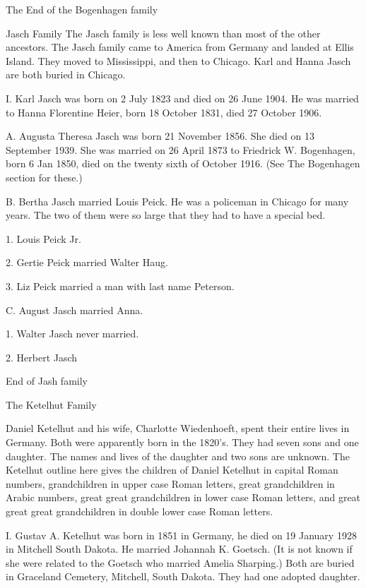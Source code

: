 \documentclass[a4paper]{article}
\begin{document}
\vskip 4mm
The End of the Bogenhagen family


\pagebreak

{\Huge \noindent Jasch Family}
\vskip 5mm
	The Jasch family is less well known than most of the other ancestors. The Jasch family came to America from Germany and landed at Ellis Island.  They moved to Mississippi, and then to Chicago.  Karl and Hanna Jasch are both buried in Chicago.  

I.  Karl Jasch was born on 2 July 1823 and died on 26 June 1904.  He was married to Hanna 
Florentine Heier, born 18 October 1831, died 27 October 1906.
 
A. Augusta Theresa Jasch was born 21 November 1856.  She died on 13 September 1939. She was married on 26 April 1873 to Friedrick W. Bogenhagen, born 6 Jan 1850, died on the twenty sixth of	 October 1916.  (See The Bogenhagen section for these.)
 
B. Bertha Jasch married Louis Peick.  He was a policeman in Chicago for many years. The two of them were so large that they had to have a special bed.  
 
1. Louis Peick Jr.

2. Gertie Peick married Walter Haug.

3. Liz Peick married a man with last name Peterson. 

C. August Jasch married Anna.

1. Walter Jasch never married.   

2. Herbert Jasch



\vskip 4mm
End of Jash family

\pagebreak

{\Huge \noindent The Ketelhut Family}
\vskip 5mm

	Daniel Ketelhut and his wife, Charlotte Wiedenhoeft,  spent their entire lives in Germany. Both were apparently born in the 1820's.  They had seven sons and one daughter.   The names and lives of the daughter and two sons are unknown.  The Ketelhut outline here gives the children of Daniel Ketelhut in capital Roman numbers, grandchildren in upper case Roman letters, great grandchildren in Arabic numbers, great great grandchildren in lower case Roman letters, and great great great grandchildren in double lower case Roman letters.

I. Gustav A. Ketelhut was born in 1851 in Germany, he died on 19 January 1928 in Mitchell South Dakota.  He married Johannah K. Goetsch.  (It is not known if she were related to the Goetsch who married Amelia Sharping.)  Both are buried in Graceland Cemetery, Mitchell, South Dakota.  They had one adopted daughter.
\end{document}
